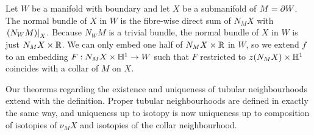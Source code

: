 \begin{defn}
	\label{def:halfneighbourhood}
	Let $W$ be a manifold with boundary and let $X$ be a submanifold of $M=\partial W$.
	The normal bundle of $X$ in $W$ is the fibre-wise direct sum of $N_M X$ with $\left.(N_W M)\right|_{X}$.
	Because $N_W M$ is a trivial bundle, the normal bundle of $X$ in $W$ is just $N_M X\times \mathbb{R}$.
	We can only embed one half of $N_M X\times \mathbb{R}$ in $W$, so we extend $f$ to an embedding $F:N_M X\times \mathbb{H}^1\to W$ such that $F$ restricted to $z(N_M X)\times\mathbb{H}^1$ coincides with a collar of $M$ on $X$.
\end{defn}

Our theorems regarding the existence and uniqueness of tubular neighbourhoods extend with the definition.
Proper tubular neighbourhoods are defined in exactly the same way, and uniqueness up to isotopy is now uniqueness up to composition of isotopies of $\nu_M X$ and isotopies of the collar neighbourhood.